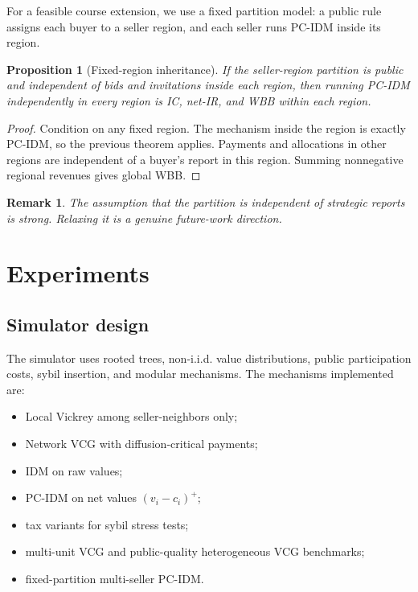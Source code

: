 \documentclass[11pt]{article}
\newtheorem{proposition}{Proposition}
\newtheorem{remark}{Remark}
\begin{document}
For a feasible course extension, we use a fixed partition model: a public rule assigns each buyer to a seller region, and each seller runs PC-IDM inside its region.

\begin{proposition}[Fixed-region inheritance]
If the seller-region partition is public and independent of bids and invitations inside each region, then running PC-IDM independently in every region is IC, net-IR, and WBB within each region.
\end{proposition}

\begin{proof}
Condition on any fixed region.  The mechanism inside the region is exactly PC-IDM, so the previous theorem applies.  Payments and allocations in other regions are independent of a buyer's report in this region.  Summing nonnegative regional revenues gives global WBB.
\end{proof}

\begin{remark}
The assumption that the partition is independent of strategic reports is strong.  Relaxing it is a genuine future-work direction.
\end{remark}

\section{Experiments}

\subsection{Simulator design}

The simulator uses rooted trees, non-i.i.d. value distributions, public participation costs, sybil insertion, and modular mechanisms.  The mechanisms implemented are:
\begin{itemize}[leftmargin=*]
    \item Local Vickrey among seller-neighbors only;
    \item Network VCG with diffusion-critical payments;
    \item IDM on raw values;
    \item PC-IDM on net values $(v_i-c_i)^+$;
    \item tax variants for sybil stress tests;
    \item multi-unit VCG and public-quality heterogeneous VCG benchmarks;
    \item fixed-partition multi-seller PC-IDM.
\end{itemize}
\end{document}
